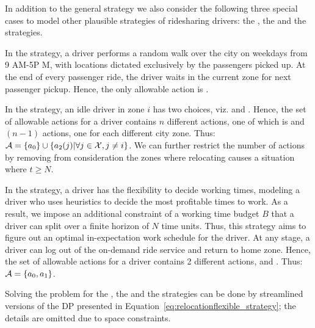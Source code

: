 { In addition to the general {\relocationflexible} strategy we also
consider the following three special cases to model other plausible strategies of ridesharing drivers: 
the {\naive}, the {\relocation} and the {\flexible} strategies.

In the {\naive} strategy, a driver performs a random walk over the city on weekdays from 9 AM-5P M, with locations dictated exclusively by the passengers picked up. At the end of every passenger ride, the driver waits in the current zone for next passenger pickup. 
Hence, the only allowable action is {\getpassenger}.

In the {\relocation} strategy, an idle driver in zone $i$ has two choices, viz. {\getpassenger} and {\relocate}. Hence, the set of allowable actions for a driver contains $n$ different actions, one of which is {\getpassenger} and $(n-1)$ {\relocate} actions, one for each different city zone.  Thus: $
\mathcal{A} =  \{a_0\} \cup \{a_2(j) | \forall j \in \mathcal{X}, j \neq i \}
$.
We can further restrict the number of {\relocate} actions by removing from consideration the zones where relocating causes a situation where $t \geq N$.

In the {\flexible} strategy, a driver has the flexibility to decide working times, modeling a driver who uses heuristics to decide the most profitable times to work.   As a result, we impose an additional constraint of a working time budget $B$ that a driver can split over a finite horizon of $N$ time units. Thus, this strategy aims to figure out an optimal 
in-expectation work schedule for the driver.  
At any stage, a driver can log out of the on-demand ride service and return to home zone. Hence, the set of allowable actions for a driver contains 2 different actions, {\getpassenger} and {\gohome}.  Thus: $
\mathcal{A} = \{a_0, a_1\}$.

Solving the {\originalproblem} problem for the {\naive}, the {\relocation} and the
{\flexible} strategies can be done by streamlined versions of the DP presented in 
Equation~\eqref{eq:relocationflexible_strategy}; the details
are omitted due to space constraints.


\begin{comment}
\iffalse
We now consider strategic behavior, modeled through a set of strategies for how 
a rational Uber driver might undertake to maximize profit over the course of a 
40-hour workweek.  


\end{comment}}
